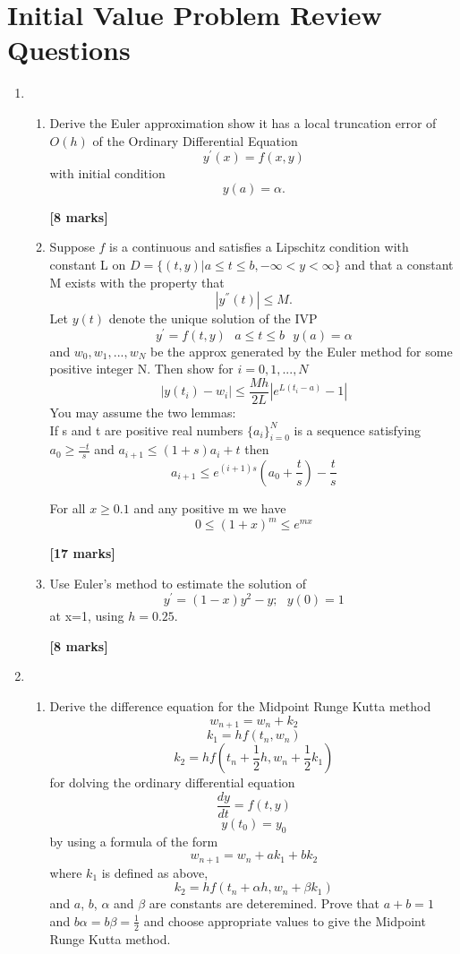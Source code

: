 
\chapter{Initial Value Problem Review Questions}
\begin{enumerate}
\item
\begin{enumerate}
\item
Derive the Euler approximation show it has a local truncation error of $O(h)$ of the Ordinary Differential Equation
\[y^{'}(x)=f(x,y) \]
with initial condition
\[y(a)=\alpha. \]
\begin{flushright}
\textbf{[8 marks]}
\end{flushright}
\item 
 Suppose $f$ is a continuous and satisfies a Lipschitz condition with constant
L on $D=\{(t,y)|a\leq t \leq b, -\infty < y < \infty \}$ and that a constant M
exists with the property that 
\[ |y^{''}(t)|\leq M. \]
Let $y(t)$ denote the unique solution of the IVP
\[ y^{'}=f(t,y) \ \ \ a\leq t \leq b \ \ \ y(a)=\alpha \]
and $w_0,w_1,...,w_N$ be the approx generated by the Euler method for some
positive integer N.  Then show for $i=0,1,...,N$
\[ |y(t_i)-w_i| \leq \frac{Mh}{2L}|e^{L(t_i-a)}-1| \]
You may assume the two lemmas:\\
If s and t are positive real numbers $\{a_i\}_{i=0}^{N}$ is a sequence satisfying $a_0 \geq \frac{-t}{s}$ and $a_{i+1} \leq (1+s)a_i +t $
then
\[a_{i+1} \leq e^{(i+1)s}\left(a_0+\frac{t}{s}\right)-\frac{t}{s} \]

For all $ x \geq 0.1$ and any positive m we have \[0\leq (1+x)^m \leq e^{mx}\]
\begin{flushright}
\textbf{[17 marks]}
\end{flushright}
\item
Use Euler's method to estimate the solution of
\[ y^{'}=(1-x)y^2-y; \ \ \ y(0)=1 \]
at x=1, using $h=0.25$.
\begin{flushright}
\textbf{[8 marks]}
\end{flushright}

\end{enumerate}
\item
\begin{enumerate}
\item
Derive the difference equation for the Midpoint Runge Kutta method\\
\[ w_{n+1}=w_n+k_2\]
\[k_1=hf(t_n,w_n)\]
\[k_2=hf(t_n+\frac{1}{2}h,w_n+\frac{1}{2}k_1)\]
for dolving the ordinary differential equation
\[ \frac{dy}{dt}=f(t,y) \]
\[y(t_0)=y_0 \]
by using a formula of the form
\[w_{n+1}=w_n+ak_1+bk_2 \]
where $k_1$ is defined as above,
\[k_2=hf(t_n+\alpha h,w_n+\beta k_1)\]
and $a$, $b$, $\alpha$ and $\beta$ are constants are deteremined. Prove that $a+b=1$ and $b\alpha=b\beta=\frac{1}{2}$ and choose appropriate values to give the Midpoint Runge Kutta method.


\end{enumerate}
\end{enumerate}

